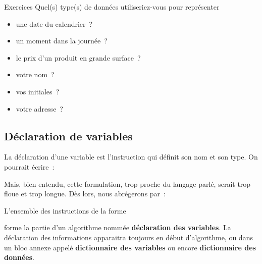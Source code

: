 			
			\begin{Emphase}[exercice]{Exercices}
				Quel(s) type(s) de données utiliseriez-vous 
				pour représenter 
				\begin{itemize}
					\item une date du calendrier~?
					\item un moment dans la journée~?
					\item le prix d’un produit en grande surface~?
					\item votre nom~?
					\item vos initiales~?
					\item votre adresse~?
				\end{itemize}
				
				\bigskip
				
			\end{Emphase}

		\subsection{Déclaration de variables}

			La déclaration d’une variable est l’instruction 
			qui définit son nom et son type. On pourrait écrire~:

			
			Mais, bien entendu, cette formulation, trop proche du
			langage parlé, serait trop floue et trop longue. 
			Dès lors, nous abrégerons par~:


			L’ensemble des instructions de la forme


			forme la partie d’un algorithme nommée 
			\textbf{déclaration des variables}. 
			La déclaration des informations apparaitra toujours en
			début d’algorithme, ou dans un bloc annexe appelé 
			\textbf{dictionnaire des variables} 
			ou encore \textbf{dictionnaire des données}.

